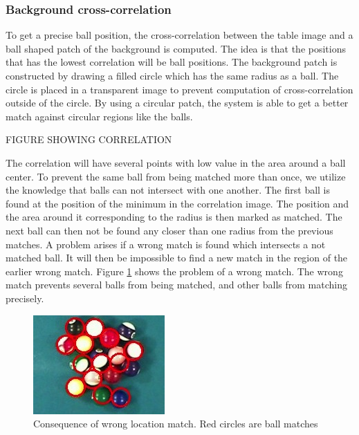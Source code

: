 \subsubsection{Background cross-correlation}
To get a precise ball position, the cross-correlation between the table image and a ball shaped patch of the background is computed. The idea is that the positions that has the lowest correlation will be ball positions. The background patch is constructed by drawing a filled circle which has the same radius as a ball. The circle is placed in a transparent image to prevent computation of cross-correlation outside of the circle. By using a circular patch, the system is able to get a better match against circular regions like the balls.

FIGURE SHOWING CORRELATION

The correlation will have several points with low value in the area around a ball center. To prevent the same ball from being matched more than once, we utilize the knowledge that balls can not intersect with one another. The first ball is found at the position of the minimum in the correlation image. The position and the area around it corresponding to the radius is then marked as matched. The next ball can then not be found any closer than one radius from the previous matches. A problem arises if a wrong match is found which intersects a not matched ball. It will then be impossible to find a new match in the region of the earlier wrong match.
Figure \ref{fig:wronglocate} shows the problem of a wrong match. The wrong match prevents several balls from being matched, and other balls from matching precisely.
\begin{figure}[h]
\begin{center}
\includegraphics{images/wronglocate.jpg}
\caption{Consequence of wrong location match. Red circles are ball matches}
\label{fig:wronglocate}
\end{center}
\end{figure}